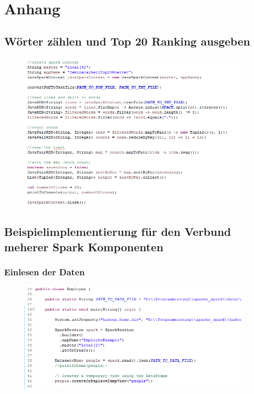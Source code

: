 \newpage
\chapter{Anhang} 

\section{Wörter zählen und Top 20 Ranking ausgeben}\label{code:wordcount}
\begin{figure}[h]
  \centering
  \includegraphics[width=140mm]{./bilder/listing_top20.PNG}  
\end{figure}

\newpage
\section{Beispielimplementierung für den Verbund meherer Spark Komponenten}
\subsection{Einlesen der Daten}\label{code:verbund_1}
\begin{figure}[h]
  \centering
  \includegraphics[width=140mm]{./bilder/code_verbund_1.PNG}
\end{figure}

